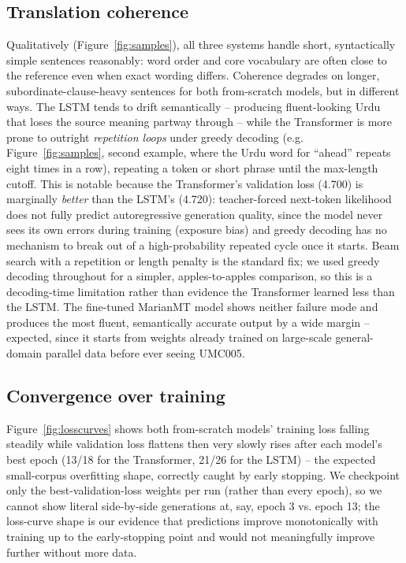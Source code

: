 \documentclass[conference]{IEEEtran}
\begin{document}
\subsection{Translation coherence}
Qualitatively (Figure~\ref{fig:samples}), all three systems handle short,
syntactically simple sentences reasonably: word order and core vocabulary
are often close to the reference even when exact wording differs. Coherence
degrades on longer, subordinate-clause-heavy sentences for both
from-scratch models, but in different ways. The LSTM tends to drift
semantically -- producing fluent-looking Urdu that loses the source meaning
partway through -- while the Transformer is more prone to outright
\emph{repetition loops} under greedy decoding (e.g. Figure~\ref{fig:samples},
second example, where the Urdu word for ``ahead'' repeats eight times in a
row), repeating a token or short phrase until the max-length cutoff. This is
notable because the
Transformer's validation loss (4.700) is marginally \emph{better} than the
LSTM's (4.720): teacher-forced next-token likelihood does not fully predict
autoregressive generation quality, since the model never sees its own
errors during training (exposure bias) and greedy decoding has no mechanism
to break out of a high-probability repeated cycle once it starts. Beam
search with a repetition or length penalty is the standard fix; we used
greedy decoding throughout for a simpler, apples-to-apples comparison, so
this is a decoding-time limitation rather than evidence the Transformer
learned less than the LSTM. The fine-tuned MarianMT model shows neither
failure mode and produces the most fluent, semantically accurate output by
a wide margin -- expected, since it starts from weights already trained on
large-scale general-domain parallel data before ever seeing UMC005.

\subsection{Convergence over training}
Figure~\ref{fig:losscurves} shows both from-scratch models' training loss
falling steadily while validation loss flattens then very slowly rises
after each model's best epoch (13/18 for the Transformer, 21/26 for the
LSTM) -- the expected small-corpus overfitting shape, correctly caught by
early stopping. We checkpoint only the best-validation-loss weights per
run (rather than every epoch), so we cannot show literal side-by-side
generations at, say, epoch 3 vs. epoch 13; the loss-curve shape is our
evidence that predictions improve monotonically with training up to the
early-stopping point and would not meaningfully improve further without
more data.
\end{document}
